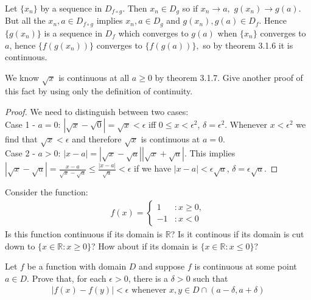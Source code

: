 \documentclass[12pt]{book}
\newcommand{\R}{\mathbb{R}}
\newenvironment{exercise}[2][Exercise]{\begin{trivlist}
\item[\hskip \labelsep {\bfseries #1}\hskip \labelsep {\bfseries #2.}]}{\end{trivlist}}
\begin{document}
\begin{exercise}{1.4.6}
\begin{exercise}{3.1.7} Let $\{x_n\}$ by a sequence in $D_{f \circ g}$. Then $x_n \in D_g$ so if $x_n \rightarrow a,$ $g(x_n) \rightarrow g(a)$. But all the $x_n, a \in D_{f \circ g}$ implies $x_n, a \in D_g$ and $g(x_n), g(a) \in D_f.$ Hence $\{g(x_n)\}$ is a sequence in $D_f$ which converges to $g(a)$ when $\{x_n\}$ converges to $a$, hence $\{f(g(x_n))\}$ converges to $\{f(g(a))\},$ so by theorem 3.1.6 it is continuous. 
\end{exercise}

\begin{exercise}{3.1.8}
    We know $\sqrt{x}$ is continuous at all $a \geq 0$ by theorem 3.1.7. Give another proof of this fact by using only the definition of continuity. 
    
    \begin{proof}
    We need to distinguish between two cases: \\
    Case 1 - $a= 0$: $|\sqrt{x} - \sqrt{0}| = \sqrt{x} < \epsilon$ iff $0 \leq x < \epsilon^2$, $\delta=\epsilon^2$. Whenever $x<\epsilon^2$ we find that $\sqrt{x}< \epsilon$ and therefore $\sqrt{x}$ is continuous at $a=0$. \\
    Case 2 - $a>0$: $|x-a|=|\sqrt{x}-\sqrt{a}| |\sqrt{x}+\sqrt{a}|$. This implies $|\sqrt{x}-\sqrt{a}| = \frac{x-a}{\sqrt{x}-\sqrt{a}} \leq \frac{|x-a|}{\sqrt{a}} < \epsilon$ if we have $|x-a| < \epsilon \sqrt{a}$, $\delta=\epsilon \sqrt{a}$.
    \end{proof}
\end{exercise}

\begin{exercise}{3.1.9}
Consider the function:
	\begin{align*}
	f(x) = \left\{
     \begin{array}{lr}
       1 & : x \geq 0,\\
       -1 & : x < 0
     \end{array}
   \right.
	\end{align*}
Is this function continuous if its domain is $\R$? Is it continous if its domain is cut down to $\{ x\in \R: x \geq 0 \}$? How about if its domain is $\{x \in \R : x \leq 0 \}$?
\end{exercise}

\begin{exercise}{3.1.10}
Let $f$ be a function with domain $D$ and suppose $f$ is continuous at some point $a \in D$. Prove that, for each $\epsilon >0$, there is a $\delta >0$ such that
	\begin{align*}
	|f(x) - f(y) | < \epsilon \text{ whenever } x,y \in D \cap (a-\delta,a+ \delta)
	\end{align*}
\end{exercise}


\end{exercise}
\end{document}
